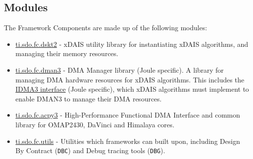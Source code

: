 \hypertarget{index_modules}{}\subsection{Modules}\label{index_modules}
The Framework Components are made up of the following modules:\begin{itemize}
\item \hyperlink{group___d_s_p_d_s_k_t2}{ti.sdo.fc.dskt2} - x\-DAIS utility library for instantiating x\-DAIS algorithms, and managing their memory resources.\item \hyperlink{group___d_s_p_d_m_a_n3}{ti.sdo.fc.dman3} - DMA Manager library (Joule specific). A library for managing DMA hardware resources for x\-DAIS algorithms. This includes the \hyperlink{group___d_s_p_i_d_m_a3}{IDMA3 interface} (Joule specific), which x\-DAIS algorithms must implement to enable DMAN3 to manage their DMA resources.\item \hyperlink{group___d_s_p_a_c_p_y3}{ti.sdo.fc.acpy3} - High-Performance Functional DMA Interface and common library for OMAP2430, Da\-Vinci and Himalaya cores.\item \hyperlink{group___d_s_p_d_b_c}{ti.sdo.fc.utils} - Utilities which frameworks can built upon, including Design By Contract ({\tt DBC}) and Debug tracing tools ({\tt DBG}). \end{itemize}
